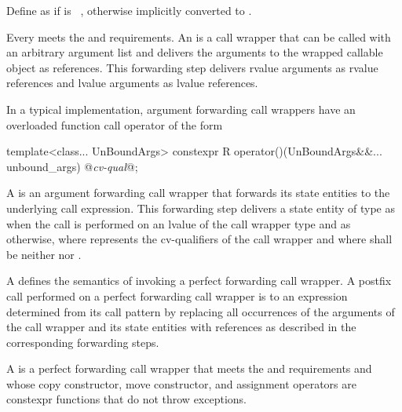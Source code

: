 \pnum
{}%
Define  as
if  is \cv{}~, otherwise
 implicitly converted
to .

\pnum
{}%
%
%
Every  meets the 
and  requirements.
An  is a
call wrapper that can be called with an arbitrary argument list
and delivers the arguments to the wrapped callable object as references.
This forwarding step delivers rvalue arguments as rvalue references
and lvalue arguments as lvalue references.
\begin{note}
In a typical implementation, argument forwarding call wrappers have
an overloaded function call operator of the form
\begin{codeblock}
template<class... UnBoundArgs>
  constexpr R operator()(UnBoundArgs&&... unbound_args) @\textit{cv-qual}@;
\end{codeblock}
\end{note}

\pnum
{}%
A  is
an argument forwarding call wrapper
that forwards its state entities to the underlying call expression.
This forwarding step delivers a state entity of type 
as \cv{} 
when the call is performed on an lvalue of the call wrapper type and
as \cv{}  otherwise,
where \cv{} represents the cv-qualifiers of the call wrapper and
where \cv{} shall be neither  nor .

\pnum
A  defines the semantics of invoking
a perfect forwarding call wrapper.
A postfix call performed on a perfect forwarding call wrapper is
 to
an expression  determined from its call pattern 
by replacing all occurrences
of the arguments of the call wrapper and its state entities
with references as described in the corresponding forwarding steps.

\pnum
A  is a perfect forwarding call wrapper that meets
the  and  requirements
and whose copy constructor, move constructor, and assignment operators
are constexpr functions that do not throw exceptions.

